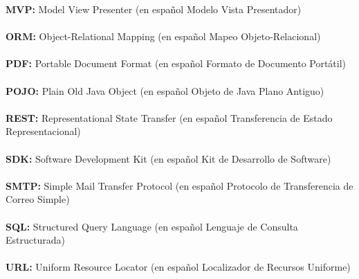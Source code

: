 \textbf{MVP:} Model View Presenter (en español Modelo Vista Presentador)\\ \\
\textbf{ORM:} Object-Relational Mapping (en español Mapeo Objeto-Relacional)\\ \\
\textbf{PDF:} Portable Document Format (en español Formato de Documento Portátil)\\ \\
\textbf{POJO:} Plain Old Java Object (en español Objeto de Java Plano Antiguo)\\ \\
\textbf{REST:} Representational State Transfer (en español Transferencia de Estado Representacional)\\ \\
\textbf{SDK:} Software Development Kit (en español Kit de Desarrollo de Software)\\ \\
\textbf{SMTP:} Simple Mail Transfer Protocol (en español Protocolo de Transferencia de Correo Simple)\\ \\
\textbf{SQL:} Structured Query Language (en español Lenguaje de Consulta Estructurada)\\ \\
\textbf{URL:} Uniform Resource Locator (en español Localizador de Recursos Uniforme)
